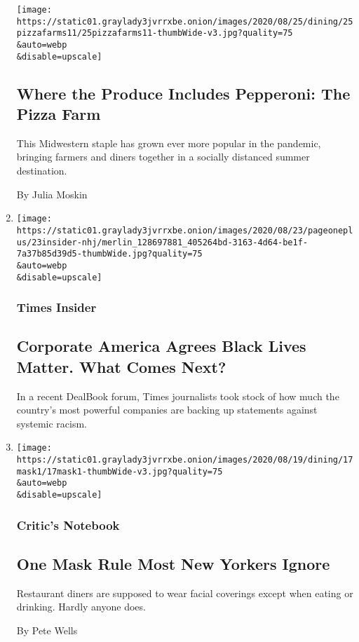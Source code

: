 \begin{enumerate}
  \texttt{[image: https://static01.graylady3jvrrxbe.onion/images/2020/08/25/dining/25pizzafarms11/25pizzafarms11-thumbWide-v3.jpg?quality=75\\\&auto=webp\\\&disable=upscale]}

  \hypertarget{where-the-produce-includes-pepperoni-the-pizza-farm}{%
  \subsection{Where the Produce Includes Pepperoni: The Pizza
  Farm}\label{where-the-produce-includes-pepperoni-the-pizza-farm}}

  This Midwestern staple has grown ever more popular in the pandemic,
  bringing farmers and diners together in a socially distanced summer
  destination.

  By Julia Moskin
\item
  \href{/2020/08/23/insider/business-racism.html}{}

  \texttt{[image: https://static01.graylady3jvrrxbe.onion/images/2020/08/23/pageoneplus/23insider-nhj/merlin\_128697881\_405264bd-3163-4d64-be1f-7a37b85d39d5-thumbWide.jpg?quality=75\\\&auto=webp\\\&disable=upscale]}

  \hypertarget{times-insider}{%
  \subsubsection{Times Insider}\label{times-insider}}

  \hypertarget{corporate-america-agrees-black-lives-matter-what-comes-next}{%
  \subsection{Corporate America Agrees Black Lives Matter. What Comes
  Next?}\label{corporate-america-agrees-black-lives-matter-what-comes-next}}

  In a recent DealBook forum, Times journalists took stock of how much
  the country's most powerful companies are backing up statements
  against systemic racism.
\item
  \href{/2020/08/17/dining/coronavirus-mask-etiquette-restaurants.html}{}

  \texttt{[image: https://static01.graylady3jvrrxbe.onion/images/2020/08/19/dining/17mask1/17mask1-thumbWide-v3.jpg?quality=75\\\&auto=webp\\\&disable=upscale]}

  \hypertarget{critics-notebook}{%
  \subsubsection{Critic's Notebook}\label{critics-notebook}}

  \hypertarget{one-mask-rule-most-new-yorkers-ignore}{%
  \subsection{One Mask Rule Most New Yorkers
  Ignore}\label{one-mask-rule-most-new-yorkers-ignore}}

  Restaurant diners are supposed to wear facial coverings except when
  eating or drinking. Hardly anyone does.

  By Pete Wells
\end{enumerate}

